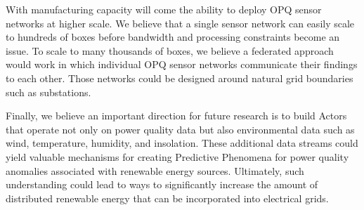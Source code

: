 With manufacturing capacity will come the ability to deploy OPQ sensor networks at higher scale. We believe that a single sensor network can easily scale to hundreds of boxes before bandwidth and processing constraints become an issue. To scale to many thousands of boxes, we believe a federated approach would work in which individual OPQ sensor networks communicate their findings to each other. Those networks could be designed around natural grid boundaries such as substations.

Finally, we believe an important direction for future research is to build Actors that operate not only on power quality data but also environmental data such as wind, temperature, humidity, and insolation.  These additional data streams could yield valuable mechanisms for creating Predictive Phenomena for power quality anomalies associated with renewable energy sources. Ultimately, such understanding could lead to ways to significantly increase the amount of distributed renewable energy that can be incorporated into electrical grids. 
